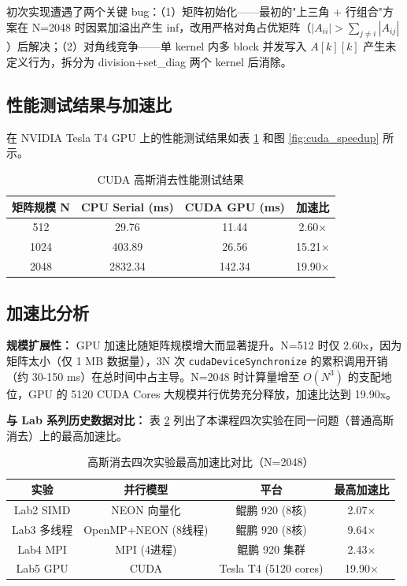 \documentclass[a4paper]{article}
\begin{document}
初次实现遭遇了两个关键 bug：（1）矩阵初始化——最初的"上三角 + 行组合"方案在 N=2048 时因累加溢出产生 inf，改用严格对角占优矩阵（$|A_{ii}| > \sum_{j \neq i} |A_{ij}|$）后解决；（2）对角线竞争——单 kernel 内多 block 并发写入 $A[k][k]$ 产生未定义行为，拆分为 division+set\_diag 两个 kernel 后消除。

\subsection{性能测试结果与加速比}

在 NVIDIA Tesla T4 GPU 上的性能测试结果如表 \ref{table:cuda} 和图 \ref{fig:cuda_speedup} 所示。

\begin{table}[H]
  \centering
  \caption{CUDA 高斯消去性能测试结果}
  \label{table:cuda}
  \begin{tabular}{|c|c|c|c|}
  \hline
  矩阵规模 N & CPU Serial (ms) & CUDA GPU (ms) & 加速比 \\
  \hline
  512 & 29.76 & 11.44 & 2.60$\times$ \\
  1024 & 403.89 & 26.56 & 15.21$\times$ \\
  2048 & 2832.34 & 142.34 & 19.90$\times$ \\
  \hline
  \end{tabular}
\end{table}

\subsection{加速比分析}

\textbf{规模扩展性：} GPU 加速比随矩阵规模增大而显著提升。N=512 时仅 2.60x，因为矩阵太小（仅 1 MB 数据量），3N 次 \texttt{cudaDeviceSynchronize} 的累积调用开销（约 30-150 ms）在总时间中占主导。N=2048 时计算量增至 $O(N^3)$ 的支配地位，GPU 的 5120 CUDA Cores 大规模并行优势充分释放，加速比达到 19.90x。

\textbf{与 Lab 系列历史数据对比：} 表 \ref{table:comparison} 列出了本课程四次实验在同一问题（普通高斯消去）上的最高加速比。

\begin{table}[H]
  \centering
  \caption{高斯消去四次实验最高加速比对比（N=2048）}
  \label{table:comparison}
  \begin{tabular}{|c|c|c|c|}
  \hline
  实验 & 并行模型 & 平台 & 最高加速比 \\
  \hline
  Lab2 SIMD & NEON 向量化 & 鲲鹏 920 (8核) & 2.07$\times$ \\
  Lab3 多线程 & OpenMP+NEON (8线程) & 鲲鹏 920 (8核) & 9.64$\times$ \\
  Lab4 MPI & MPI (4进程) & 鲲鹏 920 集群 & 2.43$\times$ \\
  Lab5 GPU & CUDA & Tesla T4 (5120 cores) & 19.90$\times$ \\
  \hline
  \end{tabular}
\end{table}
\end{document}
